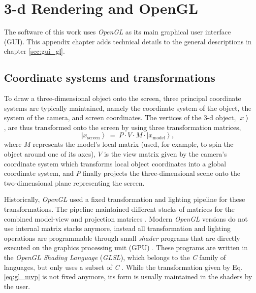 %
%

\chapter{3-d Rendering and OpenGL}
\label{ch:gl}

The software of this work uses \textit{OpenGL} \cite{web_OpenGL} as its main graphical user interface (GUI).
This appendix chapter adds technical details to the general descriptions in chapter \ref{sec:gui_gl}.



\section{Coordinate systems and transformations}

To draw a three-dimensional object onto the screen, three principal coordinate systems are typically maintained,
namely the coordinate system of the object, the system of the camera, and screen coordinates.
The vertices of the 3-d object, $\left|x\right>$ , are thus transformed onto the screen by using three
transformation matrices,
\begin{equation}
	\left|x_{\mathrm{screen}}\right> \ =\ P \cdot V \cdot  M \cdot  \left| x_{\mathrm{model}} \right>,
	\label{eq:gl_mvp}
\end{equation}
where $M$ represents the model's local matrix (used, for example, to spin the object around one of its axes),
$V$ is the view matrix given by the camera's coordinate system which transforms local object coordinates into
a global coordinate system, and $P$ finally projects the three-dimensional scene onto the two-dimensional plane
representing the screen.

Historically, \textit{OpenGL} used a fixed transformation and lighting pipeline \cite{wiki_gl_history} for
these transformations. The pipeline maintained different stacks of matrices for the combined model-view and
projection matrices \cite{web_gl_matrixmode}.
Modern \textit{OpenGL} versions do not use internal matrix stacks anymore, instead all transformation
and lighting operations are programmable through small \textit{shader} programs that are directly executed on
the graphics processing unit (GPU) \cite{wiki_gl_history}. These programs are written in the
\textit{OpenGL Shading Language} (\textit{GLSL}), which belongs to the \textit{C} family of languages, but
only uses a subset of \textit{C} \cite{wiki_glsl}.
While the transformation given by Eq. \ref{eq:gl_mvp} is not fixed anymore, its form is usually maintained
in the shaders by the user.



